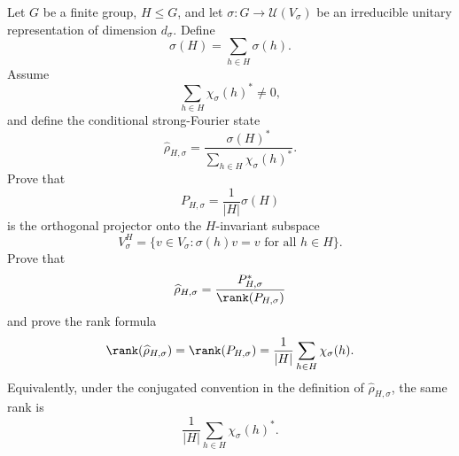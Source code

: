 Let $G$ be a finite group, $H\leq G$, and let $\sigma:G\to\mathcal U(V_\sigma)$ be an irreducible unitary representation of dimension $d_\sigma$.  Define
$$
    \sigma(H)=\sum_{h\in H}\sigma(h).
$$
Assume
$$
    \sum_{h\in H}\chi_\sigma(h)^*\neq0,
$$
and define the conditional strong-Fourier state
$$
    \widehat\rho_{H,\sigma}
    =
    \frac{\sigma(H)^*}
    {\sum_{h\in H}\chi_\sigma(h)^*}.
$$
Prove that
$$
    P_{H,\sigma}=\frac1{|H|}\sigma(H)
$$
is the orthogonal projector onto the $H$-invariant subspace
$$
    V_\sigma^H=\{v\in V_\sigma:\sigma(h)v=v\text{ for all }h\in H\}.
$$
Prove that
$$
    \widehat\rho_{H,\sigma}
    =
    \frac{P_{H,\sigma}^*}{\rank(P_{H,\sigma})}
$$
and prove the rank formula
$$
    \rank(\widehat\rho_{H,\sigma})
    =
    \rank(P_{H,\sigma})
    =
    \frac1{|H|}\sum_{h\in H}\chi_\sigma(h).
$$
Equivalently, under the conjugated convention in the definition of $\widehat\rho_{H,\sigma}$, the same rank is
$$
    \frac1{|H|}\sum_{h\in H}\chi_\sigma(h)^*.
$$
